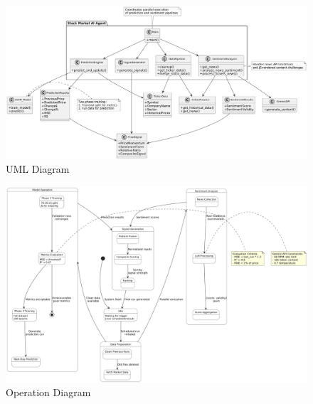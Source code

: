 \documentclass{article}
\begin{document}
	\begin{landscape}
		\begin{figure}[!htb]
			\centering
			\includegraphics[width=1.1\linewidth, keepaspectratio]{./assets/uml.png}
			\caption{UML Diagram}
			\label{fig:uml}
		\end{figure}
	\end{landscape}
	
	\begin{landscape}
		\begin{figure}[!htb] %
			\centering
			\includegraphics[width=1.4\textwidth, keepaspectratio]{./assets/operation.png}
			\caption{Operation Diagram}
			\label{fig:operation}
		\end{figure}
	\end{landscape}
	
\end{document}

